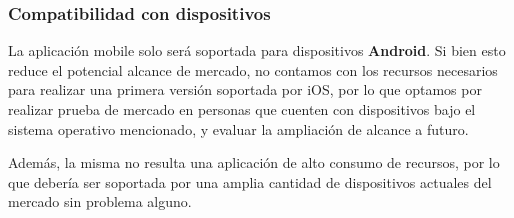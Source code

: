 \documentclass[a4paper,12pt]{article}
\begin{document}
    \subsubsection{Compatibilidad con dispositivos}
    \par La aplicación mobile solo será soportada para dispositivos \textbf{Android}. Si bien esto reduce el potencial alcance de mercado, no contamos con los recursos necesarios para realizar una primera versión soportada por iOS, por lo que optamos por realizar prueba de mercado en personas que cuenten con dispositivos bajo el sistema operativo mencionado, y evaluar la ampliación de alcance a futuro.
    \par Además, la misma no resulta una aplicación de alto consumo de recursos, por lo que debería ser soportada por una amplia cantidad de dispositivos actuales del mercado sin problema alguno.
\end{document}
